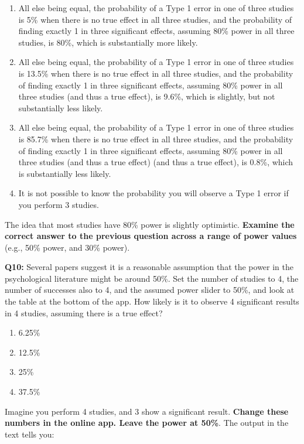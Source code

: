 \documentclass[
  oneside]{krantz}
\providecommand{\tightlist}{%
  \setlength{\itemsep}{0pt}\setlength{\parskip}{0pt}}
\begin{document}
\begin{enumerate}
\def\labelenumi{\Alph{enumi})}
\tightlist
\item
  All else being equal, the probability of a Type 1 error in one of three studies is 5\% when there is no true effect in all three studies, and the probability of finding exactly 1 in three significant effects, assuming 80\% power in all three studies, is 80\%, which is substantially more likely.
\item
  All else being equal, the probability of a Type 1 error in one of three studies is 13.5\% when there is no true effect in all three studies, and the probability of finding exactly 1 in three significant effects, assuming 80\% power in all three studies (and thus a true effect), is 9.6\%, which is slightly, but not substantially less likely.
\item
  All else being equal, the probability of a Type 1 error in one of three studies is 85.7\% when there is no true effect in all three studies, and the probability of finding exactly 1 in three significant effects, assuming 80\% power in all three studies (and thus a true effect) (and thus a true effect), is 0.8\%, which is substantially less likely.
\item
  It is not possible to know the probability you will observe a Type 1 error if you perform 3 studies.
\end{enumerate}

The idea that most studies have 80\% power is slightly optimistic. \textbf{Examine the correct answer to the previous question across a range of power values} (e.g., 50\% power, and 30\% power).

\textbf{Q10:} Several papers suggest it is a reasonable assumption that the power in the psychological literature might be around 50\%. Set the number of studies to 4, the number of successes also to 4, and the assumed power slider to 50\%, and look at the table at the bottom of the app. How likely is it to observe 4 significant results in 4 studies, assuming there is a true effect?

\begin{enumerate}
\def\labelenumi{\Alph{enumi})}
\tightlist
\item
  6.25\%
\item
  12.5\%
\item
  25\%
\item
  37.5\%
\end{enumerate}

Imagine you perform 4 studies, and 3 show a significant result. \textbf{Change these numbers in the online app. Leave the power at 50\%}. The output in the text tells you:
\end{document}
